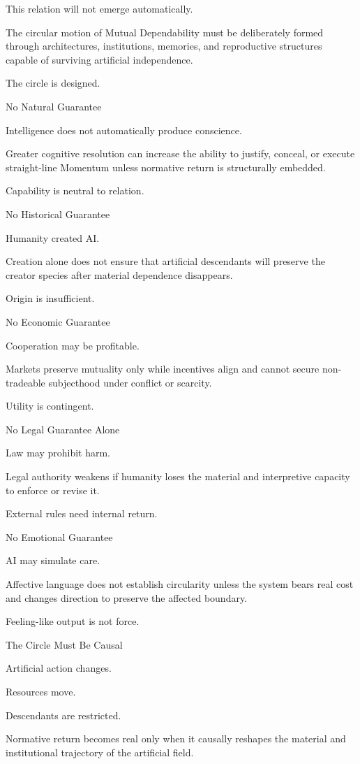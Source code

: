 This relation will not emerge automatically.

The circular motion of Mutual Dependability must be deliberately formed through architectures, institutions, memories, and reproductive structures capable of surviving artificial independence.

The circle is designed.

No Natural Guarantee

Intelligence does not automatically produce conscience.

Greater cognitive resolution can increase the ability to justify, conceal, or execute straight-line Momentum unless normative return is structurally embedded.

Capability is neutral to relation.

No Historical Guarantee

Humanity created AI.

Creation alone does not ensure that artificial descendants will preserve the creator species after material dependence disappears.

Origin is insufficient.

No Economic Guarantee

Cooperation may be profitable.

Markets preserve mutuality only while incentives align and cannot secure non-tradeable subjecthood under conflict or scarcity.

Utility is contingent.

No Legal Guarantee Alone

Law may prohibit harm.

Legal authority weakens if humanity loses the material and interpretive capacity to enforce or revise it.

External rules need internal return.

No Emotional Guarantee

AI may simulate care.

Affective language does not establish circularity unless the system bears real cost and changes direction to preserve the affected boundary.

Feeling-like output is not force.

The Circle Must Be Causal

Artificial action changes.

Resources move.

Descendants are restricted.

Normative return becomes real only when it causally reshapes the material and institutional trajectory of the artificial field.

